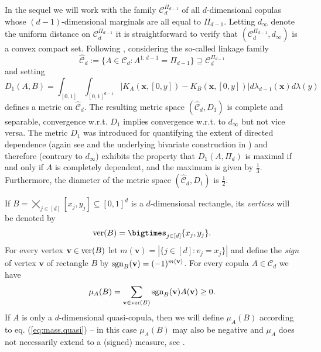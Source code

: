 \documentclass[12pt,a4paper]{amsart}
\theoremstyle{definition}
\newcommand{\kc}{\mathcal{C}}
\begin{document}
In the sequel we will work with the family $\kc_d^{\Pi_{d-1}}$ of all $d$-dimensional 
copulas whose $(d-1)$-dimensional marginals are all equal to $\Pi_{d-1}$. 
Letting $d_\infty$ denote the uniform distance on $\kc_d^{\Pi_{d-1}}$ it is straightforward
to verify that $(\kc_d^{\Pi_{d-1}},d_\infty)$ is a convex compact set. 
Following \cite{GJT}, considering the so-called linkage family
$$
\hat{\kc}_d := \{A \in \kc_d: A^{1:d-1}=\Pi_{d-1}\} \supseteq \kc_d^{\Pi_{d-1}}
$$
and setting 
\begin{equation}
D_1(A,B)= \int_{[0,1]} \int_{[0,1]^{d-1}} \big\vert K_A(\mathbf{x},[0,y]) - K_B(\mathbf{x},[0,y]) \big\vert d\lambda_{d-1}(\mathbf{x})d\lambda(y)
\end{equation}
defines a metric on $\hat{\kc}_d$. The resulting metric space 
$(\hat{\kc}_d,D_1)$ is complete and separable, convergence w.r.t. $D_1$ implies 
convergence w.r.t. to $d_\infty$ but not vice versa. The metric $D_1$ was introduced for quantifying the extent of directed dependence (again see \cite{GJT} and the underlying bivariate construction in \cite{tru11}) and 
therefore (contrary to $d_\infty$) exhibits the property that 
$D_1(A,\Pi_d)$ is maximal if and only if
$A$ is completely dependent, and the maximum is given by $\frac{1}{3}$.  
Furthermore, the diameter of the metric space $(\hat{\kc}_d,D_1)$ is $\frac{1}{2}$. 

If $B = \displaystyle\bigtimes_{j \in [d]} [x_j,y_j] \subseteq [0,1]^d$ is a $d$-dimensional rectangle, its \emph{vertices} will be denoted by
$$\textup{ver}(B)=\displaystyle\bigtimes_{j \in [d]} \{x_j,y_j\}.$$
For every vertex $\mathbf{v} \in \textup{ver}(B)$ let $m(\mathbf{v})=|\{j\in[d] \colon v_j=x_j\}|$ and define the \emph{sign} of vertex $\mathbf{v}$ of rectangle $B$ by $\textup{sgn}_B(\mathbf{v})=(-1)^{m(\mathbf{v})}$. For every copula $A\in \kc_d$ we have
\begin{equation}\label{eq:mass.quasi}
 \mu_A(B) = \sum_{\mathbf{v} \in \textup{ver}(B)} \textup{sgn}_B(\mathbf{v})A(\mathbf{v}) \ge 0.  
\end{equation}
If $A$ is only a $d$-dimensional quasi-copula, then we will define $\mu_A(B)$ 
according to eq. (\ref{eq:mass.quasi}) -- in this case $\mu_A(B)$ may also be negative
and $\mu_A$ does not necessarily extend to a (signed) measure, see \cite{DFST16}.
\end{document}
